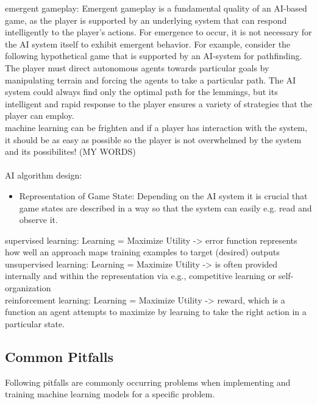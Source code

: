 \documentclass[MGS,Master,english]{twbook}%
\begin{document}
emergent gameplay: Emergent gameplay is a fundamental quality of an AI-based game, as the player is supported by an underlying system that can respond intelligently to the player’s actions. For emergence to occur, it is not necessary for the AI system itself to exhibit emergent behavior. For example, consider the following hypothetical game that is supported by an AI-system for pathfinding. The player must direct autonomous agents towards particular goals by manipulating terrain and forcing the agents to take a particular path. The AI system could always find only the optimal path for the lemmings, but its intelligent and rapid response to the player ensures a variety of strategies that the player can employ. \cite{ai::gameDesign}\\
machine learning can be frighten and if a player has interaction with the system, it should be as easy as possible so the player is not overwhelmed by the system and its possibilites! (MY WORDS)\\
\\
AI algorithm design: \cite{ai::book}
\begin{itemize}
	\item Representation of Game State: Depending on the AI system it is crucial that game states are described in a way so that the system can easily e.g. read and observe it.
\end{itemize}

supervised learning: Learning = Maximize Utility -> error function represents how well an approach maps training examples to target (desired) outputs \cite{ai::book}\\
unsupervised learning: Learning = Maximize Utility -> is often provided internally and within the representation via e.g., competitive learning or self-organization \cite{ai::book}\\
reinforcement learning: Learning = Maximize Utility -> reward, which is a function an agent attempts to maximize by learning to take the right action in a particular state. \cite{ai::book}\\

\subsection{Common Pitfalls}
Following pitfalls are commonly occurring problems when implementing and training machine learning models for a specific problem.
\end{document}
